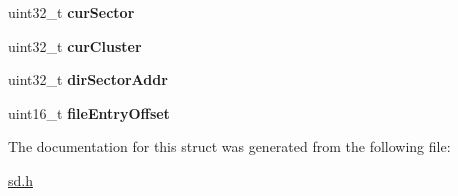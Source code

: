 \begin{DoxyCompactItemize}
\item 
\hypertarget{struct__sd__file_aa08620afd78d037e40a5c1f0f59e00a7}{uint32\-\_\-t {\bfseries cur\-Sector}}\label{struct__sd__file_aa08620afd78d037e40a5c1f0f59e00a7}

\item 
\hypertarget{struct__sd__file_add2745d6832f1cd283336f84861cb59b}{uint32\-\_\-t {\bfseries cur\-Cluster}}\label{struct__sd__file_add2745d6832f1cd283336f84861cb59b}

\item 
\hypertarget{struct__sd__file_a8a155077dd2fdb472a705eafb96f0888}{uint32\-\_\-t {\bfseries dir\-Sector\-Addr}}\label{struct__sd__file_a8a155077dd2fdb472a705eafb96f0888}

\item 
\hypertarget{struct__sd__file_a5b937953ae4b9039d0b44917da63a95e}{uint16\-\_\-t {\bfseries file\-Entry\-Offset}}\label{struct__sd__file_a5b937953ae4b9039d0b44917da63a95e}

\end{DoxyCompactItemize}


\-The documentation for this struct was generated from the following file\-:\begin{DoxyCompactItemize}
\item 
\hyperlink{sd_8h}{sd.\-h}\end{DoxyCompactItemize}
